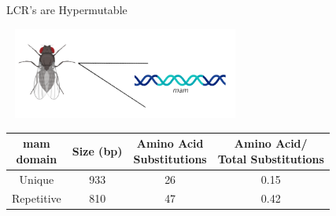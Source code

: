 \documentclass{beamer}
\begin{document}
	\begin{frame}{LCR's are Hypermutable }
		
		
		\begin{center}	
		\includegraphics[width=8cm, height=3cm]{drosophila.png}
		\end{center}
	
		\begin{center}	
		\begin{tabular}{|cccc|}
			\hline
			\makecell{\textbf{mam} \\ \textbf{domain}} & \textbf{Size (bp)} & \makecell{\textbf{Amino Acid} \\ \textbf{Substitutions}} & \makecell{\textbf{Amino Acid/} \\ \textbf{Total Substitutions}}  \\ 
			\hline
			Unique & 933 & 26 & 0.15\\ 
			\hline
			Repetitive & 810 & 47 & 0.42\\ 
			\hline
		\end{tabular}\newline\newline
		\end{center}
	
	\end{frame}
\end{document}
